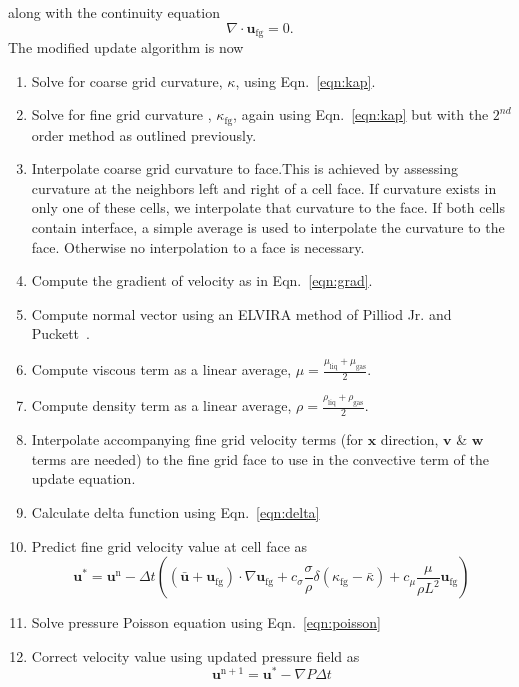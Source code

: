 along with the continuity equation
\begin{equation}
\nabla\cdot\bm{u}_\text{fg}=0.
\end{equation}
The modified update algorithm is now
\begin{enumerate}
	\item Solve for coarse grid curvature, $\kappa$, using Eqn.~\ref{eqn:kap}.
	\item Solve for fine grid curvature , $\kappa_{\text{fg}}$, again using Eqn.~\ref{eqn:kap} but with the $2^{nd}$ order method as outlined previously.
	\item Interpolate coarse grid curvature to face.This is achieved by assessing curvature at the neighbors left and right of a cell face. If curvature exists in only one of these cells, we interpolate that curvature to the face. If both cells contain interface, a simple average is used to interpolate the curvature to the face. Otherwise no interpolation to a face is necessary.
	\item Compute the gradient of velocity as in Eqn.~\ref{eqn:grad}.
	\item Compute normal vector using an ELVIRA method of Pilliod Jr. and Puckett~\cite{pilliod}.
	\item Compute viscous term as a linear average, $\mu =\frac{ \mu_{\text{liq}} + \mu_{\text{gas}}}{2}$.
	\item Compute density term as a linear average, $\rho =\frac{ \rho_{\text{liq}} + \rho_{\text{gas}}}{2}$.
	\item Interpolate accompanying fine grid velocity terms (for $\bm{x}$ direction, $\bm{v}$ \& $\bm{w}$ terms are needed) to the fine grid face to use in the convective term of the update equation.
	\item Calculate delta function using Eqn.~\ref{eqn:delta}
	\item Predict fine grid velocity value at cell face as 
	\begin{equation}
	\bm{u}^{*}= \bm{u}^{\text{n}} - \Delta t(
	(\bar{\bm{u}}+\bm{u}_{\text{fg}}) \cdot \nabla \bm{u}_{\text{fg}} 
	+c_{\sigma}\frac{\sigma}{\rho}\delta(\kappa_{\text{fg}}-\bar{\kappa}) 
	+c_{\mu}\frac{\mu}{\rho L^2}\bm{u}_{\text{fg}})
	\label{eqn:myupdate}
	\end{equation}
	\item Solve pressure Poisson equation using Eqn.~\ref{eqn:poisson}
	\item Correct velocity value using updated pressure field as 
	\begin{equation}
	\bm{u}^{\text{n}+1} = \bm{u}^* - \nabla P \Delta t
	\end{equation}
\end{enumerate}

